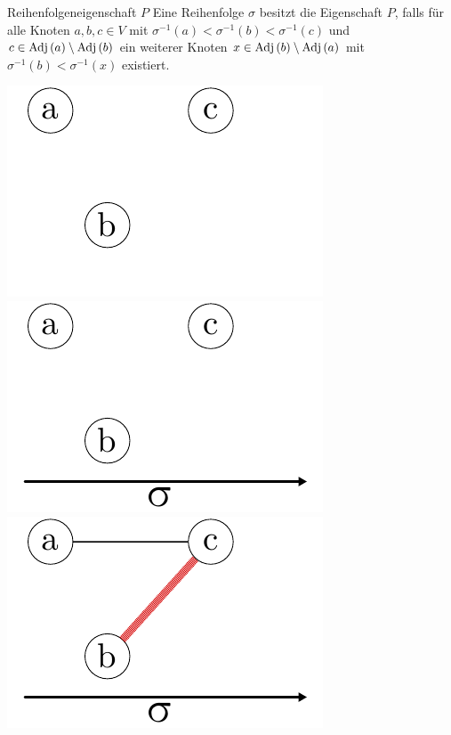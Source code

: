 \documentclass[xcolor=x11names,compress]{beamer}
\begin{document}
\begin{frame}
	\begin{block}{Reihenfolgeneigenschaft \( P \)}
		Eine Reihenfolge \( \sigma\) besitzt die Eigenschaft \( P \), falls für alle Knoten \( a, b, c \in V \) mit \( \sigma^{-1} \left( a \right) < \sigma^{-1} \left( b \right) < \sigma^{-1} \left( c \right)\) und \( c \in \textnormal{Adj} \left( a \right) \setminus \textnormal{Adj} \left( b \right) \) ein weiterer Knoten \( x \in \textnormal{Adj} \left( b \right) \setminus \textnormal{Adj} \left( a \right) \) mit \( \sigma^{-1} \left( b \right) < \sigma^{-1} \left( x \right) \) existiert.
	\end{block}

	\begin{center}
		\begin{overprint}
			\includegraphics[scale=1.0]{img/graph/p/01.pdf}
			\onslide<3>\includegraphics[scale=1.0]{img/graph/p/02.pdf}
			\onslide<4>\includegraphics[scale=1.0]{img/graph/p/03.pdf}

\end{overprint}
\end{center}
\end{frame}
\end{document}
